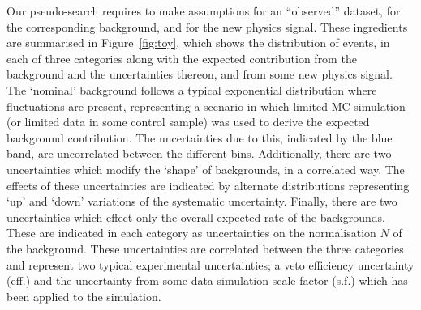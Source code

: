 \documentclass[11pt]{article}
\begin{document}
Our pseudo-search requires to make  assumptions for an ``observed'' dataset, for the corresponding background, and for the new physics signal.  These ingredients are summarised in Figure~\ref{fig:toy},   
which shows the distribution of events, in each of three categories along with the expected contribution from the background 
and the uncertainties thereon, 
and from some new physics signal.
The `nominal' background follows a typical exponential distribution where fluctuations are present, representing a scenario in which limited MC  simulation (or limited data in some control sample) was used
to derive the expected background contribution. The uncertainties due to this, indicated by the blue band, are uncorrelated between the different bins. Additionally, there are two uncertainties which modify the `shape' of
backgrounds, in a correlated way. The effects of these uncertainties are indicated by alternate distributions representing `up' and `down' variations of the systematic uncertainty. Finally, there are two uncertainties
which effect only the overall expected rate of the backgrounds. These are indicated in each category as uncertainties on the normalisation $N$ of the background. These uncertainties are correlated between the three categories
and represent two typical experimental uncertainties; a veto efficiency uncertainty (eff.) and the uncertainty from some data-simulation scale-factor (s.f.) which has been applied to the simulation.
\end{document}
